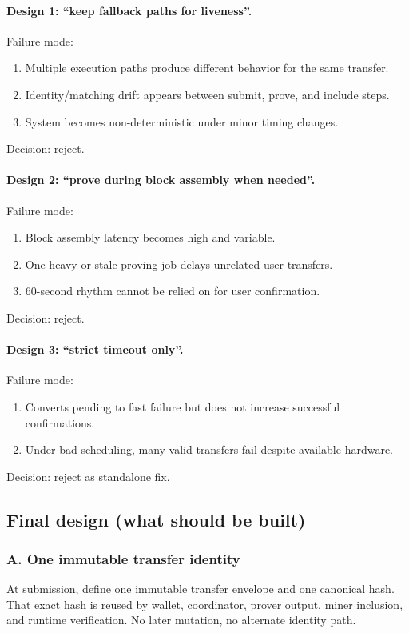 \documentclass[11pt]{article}
\begin{document}
\paragraph{Design 1: ``keep fallback paths for liveness''.}
Failure mode:
\begin{enumerate}[leftmargin=2em]
  \item Multiple execution paths produce different behavior for the same transfer.
  \item Identity/matching drift appears between submit, prove, and include steps.
  \item System becomes non-deterministic under minor timing changes.
\end{enumerate}
Decision: reject.

\paragraph{Design 2: ``prove during block assembly when needed''.}
Failure mode:
\begin{enumerate}[leftmargin=2em]
  \item Block assembly latency becomes high and variable.
  \item One heavy or stale proving job delays unrelated user transfers.
  \item 60-second rhythm cannot be relied on for user confirmation.
\end{enumerate}
Decision: reject.

\paragraph{Design 3: ``strict timeout only''.}
Failure mode:
\begin{enumerate}[leftmargin=2em]
  \item Converts pending to fast failure but does not increase successful confirmations.
  \item Under bad scheduling, many valid transfers fail despite available hardware.
\end{enumerate}
Decision: reject as standalone fix.

\subsection{Final design (what should be built)}

\subsubsection*{A. One immutable transfer identity}
At submission, define one immutable transfer envelope and one canonical hash.
That exact hash is reused by wallet, coordinator, prover output, miner inclusion,
and runtime verification. No later mutation, no alternate identity path.
\end{document}
